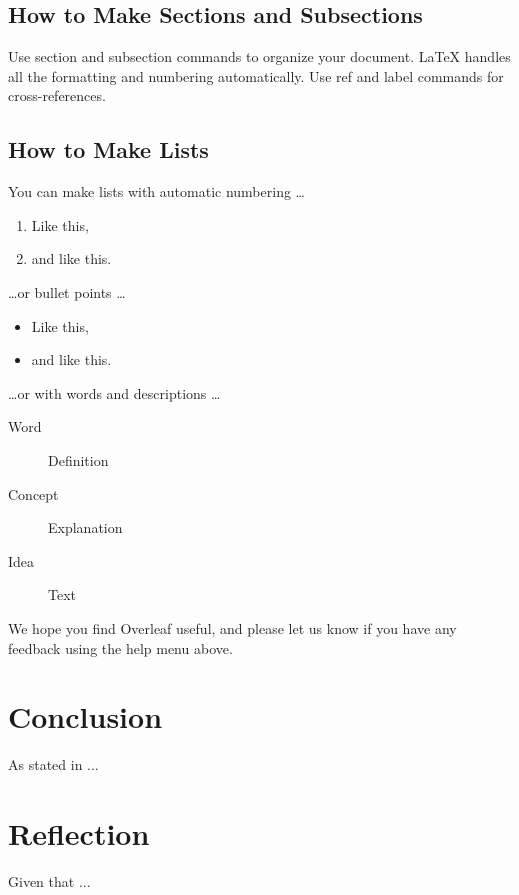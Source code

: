 \documentclass[a4paper]{article}
\begin{document}
\subsection{How to Make Sections and Subsections}

Use section and subsection commands to organize your document. \LaTeX{} handles all the formatting and numbering automatically. Use ref and label commands for cross-references.

\subsection{How to Make Lists}

You can make lists with automatic numbering \dots

\begin{enumerate}
\item Like this,
\item and like this.
\end{enumerate}
\dots or bullet points \dots
\begin{itemize}
\item Like this,
\item and like this.
\end{itemize}
\dots or with words and descriptions \dots
\begin{description}
\item[Word] Definition
\item[Concept] Explanation
\item[Idea] Text
\end{description}

We hope you find Overleaf useful, and please let us know if you have any feedback using the help menu above.



\section{Conclusion}
\label{sec:conclusion}

As stated in ...


\section{Reflection}
\label{sec:reflection}
Given that ...






\end{document}
